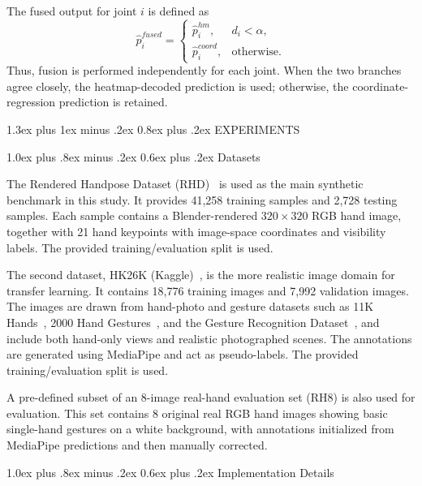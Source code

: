 ﻿\documentclass[10pt,letterpaper]{article}
\makeatletter
\renewcommand\section{\@startsection{section}{1}{\z@}%
  {1.3ex plus 1ex minus .2ex}%
  {0.8ex plus .2ex}%
  {\centering\normalfont\small\scshape}}
\renewcommand\subsection{\@startsection{subsection}{2}{\z@}%
  {1.0ex plus .8ex minus .2ex}%
  {0.6ex plus .2ex}%
  {\normalfont\itshape}}
\makeatother
\begin{document}
The fused output for joint \(i\) is defined as
\begin{equation}
\hat{p}^{fused}_i =
\begin{cases}
\hat{p}^{hm}_i, & d_i < \alpha, \\
\hat{p}^{coord}_i, & \text{otherwise.}
\end{cases}
\label{eq:fused-output}
\end{equation}
Thus, fusion is performed independently for each joint. When the two branches agree closely, the heatmap-decoded prediction is used; otherwise, the coordinate-regression prediction is retained.

\section{EXPERIMENTS}

\subsection{Datasets}

The Rendered Handpose Dataset (RHD)~\cite{rhd} is used as the main synthetic benchmark in this study. It provides 41,258 training samples and 2,728 testing samples. Each sample contains a Blender-rendered $320 \times 320$ RGB hand image, together with 21 hand keypoints with image-space coordinates and visibility labels. The provided training/evaluation split is used.

The second dataset, HK26K (Kaggle)~\cite{hk26k}, is the more realistic image domain for transfer learning. It contains 18,776 training images and 7,992 validation images. The images are drawn from hand-photo and gesture datasets such as 11K Hands~\cite{hands11k}, 2000 Hand Gestures~\cite{giridhar_hand_gestures}, and the Gesture Recognition Dataset~\cite{gesture_recognition_kaggle}, and include both hand-only views and realistic photographed scenes. The annotations are generated using MediaPipe and act as pseudo-labels. The provided training/evaluation split is used.

A pre-defined subset of an 8-image real-hand evaluation set (RH8) is also used for evaluation. This set contains 8 original real RGB hand images showing basic single-hand gestures on a white background, with annotations initialized from MediaPipe predictions and then manually corrected.

\subsection{Implementation Details}
\end{document}
